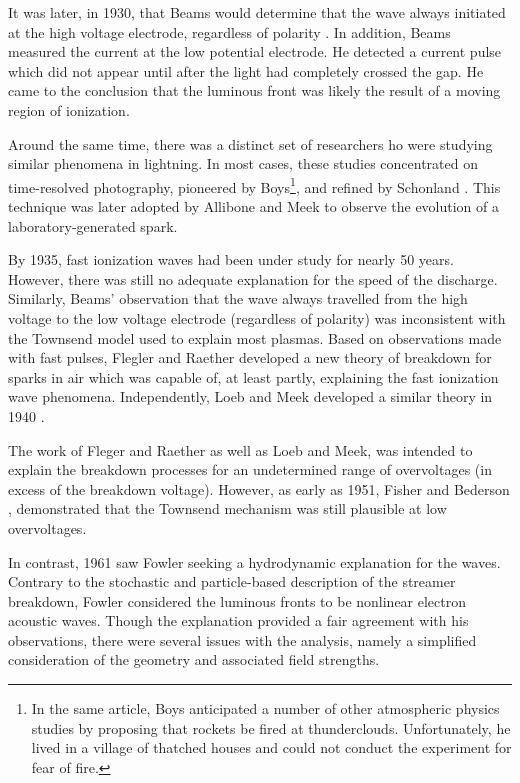 It was later, in 1930, that Beams would determine that the wave always initiated
at the high voltage electrode, regardless of polarity \cite{Beams1930}. In
addition, Beams measured the current at the low potential electrode. He detected
a current pulse which did not appear until after the light had completely
crossed the gap. He came to the conclusion that the luminous front was likely
the result of a moving region of ionization.

Around the same time, there was a distinct set of researchers ho were studying
similar phenomena in lightning. In most cases, these studies concentrated on
time-resolved photography, pioneered by Boys\footnote{In the same article, Boys
anticipated a number of other atmospheric physics studies by proposing that
rockets be fired at thunderclouds. Unfortunately, he lived in a village of
thatched houses and could not conduct the experiment for fear of
fire.}\cite{Boys1926}, and refined by Schonland \cite{Schonland1935}. This
technique was later adopted by Allibone and Meek \cite{Allibone1938} to observe
the evolution of a laboratory-generated spark.


By 1935, fast ionization waves had been under study for nearly 50 years.
However, there was still no adequate explanation for the speed of the discharge.
Similarly, Beams' observation that the wave always travelled from the high
voltage to the low voltage electrode (regardless of polarity) was inconsistent
with the Townsend model used to explain most plasmas. Based on observations made
with fast pulses, Flegler and Raether developed a new theory of breakdown for
sparks in air \cite{Flegler1936} which was capable of, at least partly,
explaining the fast ionization wave phenomena. Independently, Loeb and Meek
developed a similar theory in 1940 \cite{Loeb1940}.

The work of Fleger and Raether as well as Loeb and Meek, was intended to explain
the breakdown processes for an undetermined range of overvoltages (in excess of
the breakdown voltage). However, as early as 1951, Fisher and Bederson
\cite{Fisher1951}, demonstrated that the Townsend mechanism was still plausible
at low overvoltages.

In contrast, 1961 saw Fowler \cite{Fowler1961} seeking a hydrodynamic
explanation for the waves. Contrary to the stochastic and particle-based
description of the streamer breakdown, Fowler considered the luminous fronts to
be nonlinear electron acoustic waves. Though the explanation provided a fair
agreement with his observations, there were several issues with the analysis,
namely a simplified consideration of the geometry and associated field
strengths.

